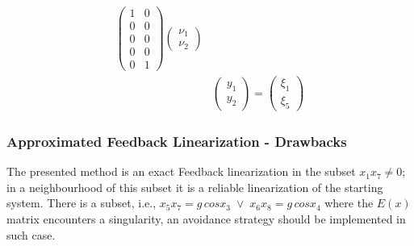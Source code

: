 \begin{frame}
\begin{equation}
\begin{aligned}
\begin{pmatrix}
	 		1 &0 \\
	 		0 &0 \\
	 		0 &0 \\
	 		0 &0 \\
	 		0 &1
	 	\end{pmatrix}
	 	\begin{pmatrix}
	 		\nu_1 \\ \nu_2
	 	\end{pmatrix}\\[6pt]
	 	&\begin{pmatrix}
	 		y_1\\ y_2
	 	\end{pmatrix}=%
	 	\begin{pmatrix}
	 		\xi_1\\ \xi_5
	 	\end{pmatrix}%
	\end{aligned}
\end{equation}
\end{frame}
%
\begin{frame}
\frametitle{Approximated Feedback Linearization - Drawbacks}
The presented method is an exact Feedback linearization in the subset $x_1x_7 \neq 0$; in a neighbourhood of this subset it is a reliable linearization of the starting system. There is a subset, i.e., $x_5x_7 = g\,cosx_3\; \lor\; x_6x_8 = g\,cosx_4$ where the $E(x)$ matrix encounters a singularity, an avoidance strategy should be implemented in such case.
\end{frame}
